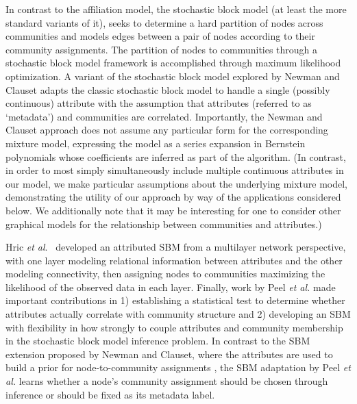In contrast to the affiliation model, the stochastic block model \cite{sbmOrig} (at least the more standard variants of it), seeks to determine a hard partition of nodes across communities and models edges between a pair of nodes according to their community assignments. The partition of nodes to communities through a stochastic block model framework is accomplished through maximum likelihood optimization. A variant of the stochastic block model explored by Newman and Clauset \cite{clauset} adapts the classic stochastic block model to handle a single (possibly continuous) attribute with the assumption that attributes (referred to as `metadata') and communities are correlated. Importantly, the Newman and Clauset approach does not assume any particular form for the corresponding mixture model, expressing the model as a series expansion in Bernstein polynomials whose coefficients are inferred as part of the algorithm. (In contrast, in order to most simply simultaneously include multiple continuous attributes in our model, we make particular assumptions about the underlying mixture model, demonstrating the utility of our approach by way of the applications considered below. We additionally note that it may be interesting for one to consider other graphical models for the relationship between communities and attributes.)

Hric \emph{et al}.~\cite{hric} developed an attributed SBM from a multilayer network perspective, with one layer modeling relational information between attributes and the other modeling connectivity, then assigning nodes to communities maximizing the likelihood of the observed data in each layer. Finally, work by Peel \emph{et al.} \cite{peel2017ground} made important contributions in 1) establishing a statistical test to determine whether attributes actually correlate with community structure and 2) developing an SBM with flexibility in how strongly to couple attributes and community membership in the stochastic block model inference problem. In contrast to the SBM extension proposed by Newman and Clauset,  where the attributes are used to build a prior for node-to-community assignments \cite{clauset}, the SBM adaptation by Peel \emph{et al.} learns whether a node's community assignment should be chosen through inference or should be fixed as its metadata label. 

